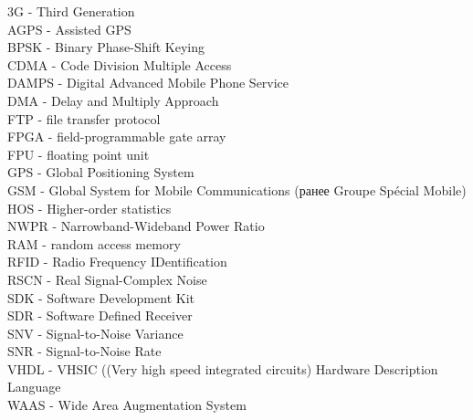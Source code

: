 \noindent
3G - Third Generation						\\
AGPS - Assisted GPS						\\
BPSK - Binary Phase-Shift Keying				\\
CDMA - Code Division Multiple Access				\\
DAMPS - Digital Advanced Mobile Phone Service			\\
DMA - Delay and Multiply Approach				\\
FTP - file transfer protocol					\\
FPGA - field-programmable gate array 				\\
FPU - floating point unit					\\
GPS - Global Positioning System					\\
GSM - Global System for Mobile Communications (ранее Groupe Spécial Mobile) \\
HOS - Higher-order statistics					\\
NWPR - Narrowband-Wideband Power Ratio				\\
RAM - random access memory					\\
RFID - Radio Frequency IDentification				\\
RSCN - Real Signal-Complex Noise				\\
SDK - Software Development Kit					\\
SDR - Software Defined Receiver					\\
SNV - Signal-to-Noise Variance					\\
SNR - Signal-to-Noise Rate					\\
VHDL - VHSIC ((Very high speed integrated circuits) Hardware Description Language			\\
WAAS - Wide Area Augmentation System				\\


\clearpage
